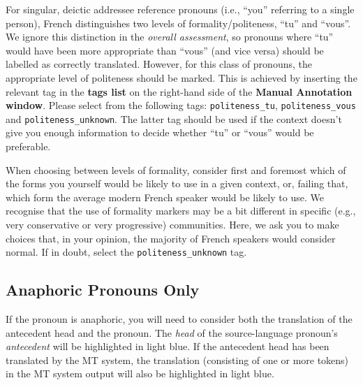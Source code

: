 \documentclass[11pt]{article} %
\newcommand\tag[1]{\texttt{#1}}
\begin{document}
For singular, deictic addressee reference pronouns (i.e., ``you'' referring to
a single person), French distinguishes two levels of formality/politeness,
``tu'' and ``vous''. We ignore this distinction in the \emph{overall
assessment},  so pronouns where ``tu'' would have been more appropriate
than ``vous'' (and vice versa) should be labelled as correctly translated.
However, for this class of pronouns, the appropriate level of politeness should
be marked. This is achieved by inserting the relevant tag in the \textbf{tags list} on the
right-hand side of the \textbf{Manual Annotation window}. Please select from the following tags:
\tag{politeness\_tu}, \tag{politeness\_vous} and \tag{politeness\_unknown}.
The latter tag should be used if the context doesn't give you enough information
to decide whether ``tu'' or ``vous'' would be preferable.

When choosing between levels of formality, consider first and foremost which of
the forms you yourself would be likely to use in a given context, or, failing
that, which form the average modern French speaker would be likely to use. We
recognise that the use of formality markers may be a bit different in specific
(e.g., very conservative or very progressive) communities. Here, we ask you to
make choices that, in your opinion, the majority of French speakers would
consider normal. If in doubt, select the
\tag{politeness\_unknown} tag.

\subsection{Anaphoric Pronouns Only}
\label{AnaphoricGuidelines}

If the pronoun is anaphoric, you will need to consider both the translation of the antecedent head and the pronoun. The \textit{head} of the source-language pronoun's \textit{antecedent} will be highlighted in light blue. If the antecedent head has been translated by the MT system, the translation (consisting of one or more tokens) in the MT system output will also be highlighted in light blue.
\end{document}
